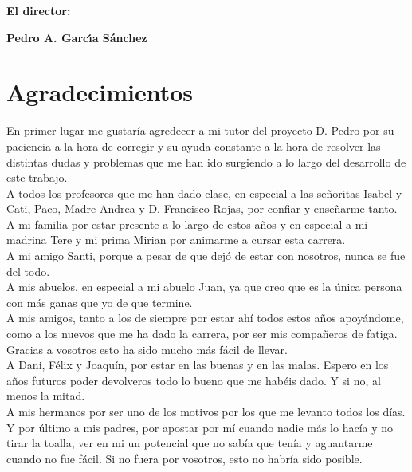 \textbf{El director:}

\vspace{5cm}

\noindent \textbf{Pedro A. Garcı́a Sánchez}

\chapter*{Agradecimientos}
\thispagestyle{empty}

       \vspace{1cm}


En primer lugar me gustaría agredecer a mi tutor del proyecto D. Pedro por su paciencia a la hora de corregir y su ayuda constante a la hora de resolver las distintas dudas y problemas que me han ido surgiendo a lo largo del desarrollo de este trabajo.\\
A todos los profesores que me han dado clase, en especial a las señoritas Isabel y Cati, Paco, Madre Andrea y D. Francisco Rojas, por confiar y enseñarme tanto.\\
A mi familia por estar presente a lo largo de estos años y en especial a mi madrina Tere y mi prima Mirian por animarme a cursar esta carrera.\\
A mi amigo Santi, porque a pesar de que dejó de estar con nosotros, nunca se fue del todo.\\
A mis abuelos, en especial a mi abuelo Juan, ya que creo que es la única persona con más ganas que yo de que termine.\\
A mis amigos, tanto a los de siempre por estar ahí todos estos años apoyándome, como  a los nuevos que me ha dado la carrera, por ser mis compañeros de fatiga. Gracias a vosotros esto ha sido mucho más fácil de llevar.\\
A Dani, Félix y Joaquín, por estar en las buenas y en las malas. Espero en los años futuros poder devolveros todo lo bueno que me habéis dado. Y si no, al menos la mitad.\\
A mis hermanos por ser uno de los motivos por los que me levanto todos los días.\\
Y por último a mis padres, por apostar por mí cuando nadie más lo hacía y no tirar la toalla, ver en mi un potencial que no sabía que tenía y aguantarme cuando no fue fácil. Si no fuera por vosotros, esto no habría sido posible.

